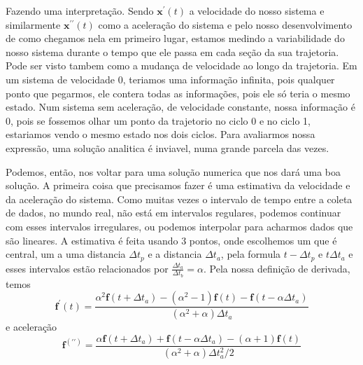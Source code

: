 \documentclass{report}[12pt]
\begin{document}
Fazendo uma interpretação. Sendo \(\mathbf{x}^\prime  (t)\) a velocidade do nosso sistema e  similarmente
\(\mathbf{x}^{\prime \prime }(t)\)  como a aceleração do sistema e pelo nosso desenvolvimento de como chegamos
nela em primeiro lugar, estamos medindo a variabilidade do nosso sistema durante o tempo que ele passa
em cada seção da sua trajetoria. Pode ser visto tambem como a mudança de velocidade ao longo da trajetoria.
Em um sistema de velocidade 0, teriamos uma informação infinita, pois qualquer ponto que pegarmos, 
ele contera todas as informações, pois ele só teria o mesmo estado. Num sistema sem aceleração, de velocidade constante, nossa informação é
0, pois se fossemos olhar um ponto da trajetorio no ciclo 0 e no ciclo 1, estariamos vendo o mesmo estado
nos dois ciclos. Para avaliarmos nossa expressão, uma solução analitica é inviavel, numa grande
parcela das vezes. \par
Podemos, então, nos voltar para uma solução numerica que nos dará uma boa solução. A primeira coisa
que precisamos fazer é uma estimativa da velocidade e da aceleração do sistema. Como muitas vezes
o intervalo de tempo entre a coleta de dados, no mundo real, não está em intervalos regulares, podemos
continuar com esses intervalos irregulares, ou podemos interpolar para acharmos dados que são lineares.
A estimativa é feita usando 3 pontos, onde escolhemos um que é central, um a uma distancia \(\Delta t_p\) 
e a distancia \(\Delta t_a\), pela formula \(t-\Delta t_p\) e \(t\Delta t_a\) e esses intervalos estão
relacionados por \(\frac{\Delta t_a}{\Delta t_b}=\alpha \). Pela nossa definição de derivada, temos
\begin{equation}
    \mathbf{f^\prime }(t)=\frac{\alpha^{2} \mathbf{f} (t+\Delta t_a)-(\alpha ^{2} -1)\mathbf{f}(t)-\mathbf{f} (t-\alpha \Delta t_a)}{(\alpha ^{2} +\alpha )\Delta t_a} 
\end{equation}
e aceleração
\begin{equation}
    \mathbf{f} ^{(\prime \prime)}=\frac{\alpha \mathbf{f} (t+\Delta t_a)+\mathbf{f} (t-\alpha \Delta t_a)-(\alpha +1)\mathbf{f} (t)}{(\alpha ^{2} +\alpha )\Delta t_{a}^{2} /2 }
\end{equation}
\end{document}
